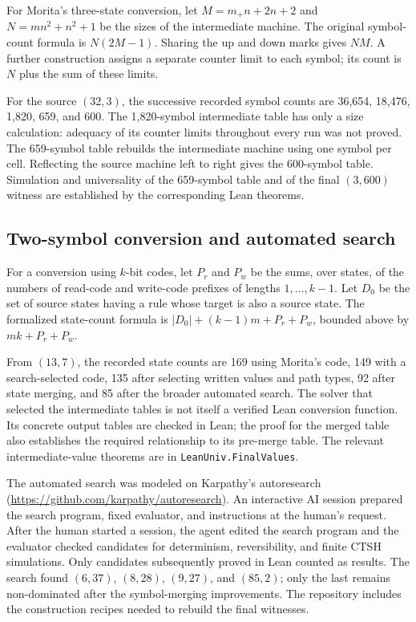 For Morita's three-state conversion, let
$M=m_+n+2n+2$ and $N=mn^2+n^2+1$ be the sizes of the intermediate machine.
The original symbol-count formula is $N(2M-1)$. Sharing the up and down marks
gives $NM$. A further construction assigns a separate counter limit to each
symbol; its count is $N$ plus the sum of these limits.

For the source $(32,3)$, the successive recorded symbol counts are 36,654,
18,476, 1,820, 659, and 600. The 1,820-symbol intermediate table has only a
size calculation: adequacy of its counter limits throughout every run was
not proved. The 659-symbol table rebuilds the intermediate machine using
one symbol per cell. Reflecting the source machine left to right gives the
600-symbol table. Simulation and universality of the 659-symbol table and
of the final $(3,600)$ witness are established by the corresponding Lean
theorems.

\subsection{Two-symbol conversion and automated search}

For a conversion using $k$-bit codes, let $P_r$ and $P_w$ be the sums, over
states, of the numbers of read-code and write-code prefixes of lengths
$1,\ldots,k-1$. Let $D_0$ be the set of source states having a rule whose
target is also a source state. The formalized state-count formula is
$|D_0|+(k-1)m+P_r+P_w$, bounded above by $mk+P_r+P_w$.

From $(13,7)$, the recorded state counts are 169 using Morita's code,
149 with a search-selected code, 135 after selecting written values and path
types, 92 after state merging, and 85 after the broader automated search.
The solver that selected the intermediate tables is not itself a verified
Lean conversion function. Its concrete output tables are checked in Lean;
the proof for the merged table also establishes the required relationship
to its pre-merge table. The relevant intermediate-value theorems are in
\texttt{LeanUniv.FinalValues}.

The automated search was modeled on Karpathy's autoresearch
(\url{https://github.com/karpathy/autoresearch}).
An interactive AI session prepared the search program, fixed evaluator,
and instructions at the human's request. After the human started a session,
the agent edited the search program and the evaluator checked candidates
for determinism, reversibility, and finite CTSH simulations. Only candidates
subsequently proved in Lean counted as results. The search found $(6,37)$,
$(8,28)$, $(9,27)$, and $(85,2)$; only the last remains non-dominated after
the symbol-merging improvements. The repository includes the construction
recipes needed to rebuild the final witnesses.

